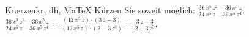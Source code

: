 \begin{MAufgabe}{Kuerzen}{kr, dh, MaTeX}
K\"urzen Sie soweit m\"oglich: $\frac{36\, x^5\, z^2 - 36\, x^5\, z}{24\, x^5\, z - 36\, x^5\, z^4}$.\\ 
\ifLsg\MLoesung
\quad $\frac{36\, x^5\, z^2 - 36\, x^5\, z}{24\, x^5\, z - 36\, x^5\, z^4}=\frac{(12\, x^5\, z)\cdot(3\, z - 3)}{(12\, x^5\, z)\cdot(2 - 3\, z^3)}=\frac{3\, z - 3}{2 - 3\, z^3}$.\else\relax\fi
 \end{MAufgabe}